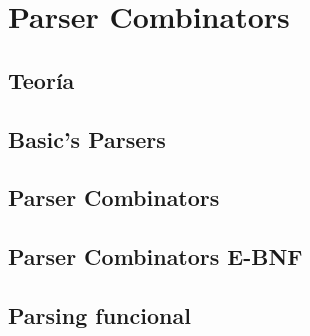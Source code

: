 
\chapter{Parser Combinators}



\section{Teoría}

\section{Basic's Parsers}

\section{Parser Combinators}

\section{Parser Combinators E-BNF}
	
\section{Parsing funcional}




